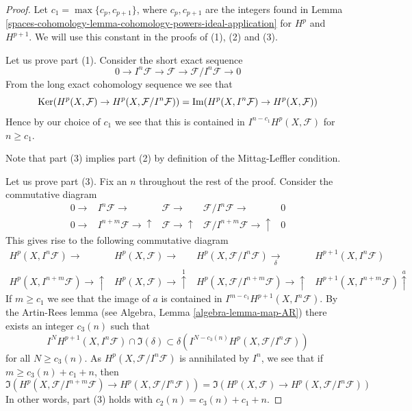 \begin{proof}
Let $c_1 = \max\{c_p, c_{p + 1}\}$, where $c_p, c_{p +1}$ are the integers
found in Lemma \ref{spaces-cohomology-lemma-cohomology-powers-ideal-application} for
$H^p$ and $H^{p + 1}$. We will use this constant in the proofs of
(1), (2) and (3).

\medskip\noindent
Let us prove part (1). Consider the short exact sequence
$$
0 \to I^n\mathcal{F} \to \mathcal{F} \to \mathcal{F}/I^n\mathcal{F} \to 0
$$
From the long exact cohomology sequence we see that
$$
\operatorname{Ker}(
H^p(X, \mathcal{F}) \to H^p(X, \mathcal{F}/I^n\mathcal{F})
)
=
\operatorname{Im}(
H^p(X, I^n\mathcal{F}) \to H^p(X, \mathcal{F})
)
$$
Hence by our choice of $c_1$ we see that this is contained in
$I^{n - c_1}H^p(X, \mathcal{F})$ for $n \geq c_1$.

\medskip\noindent
Note that part (3) implies part (2) by definition of the Mittag-Leffler
condition.

\medskip\noindent
Let us prove part (3).
Fix an $n$ throughout the rest of the proof.
Consider the commutative diagram
$$
\begin{array}{ccccc}0 \longrightarrow & I^n\mathcal{F} \longrightarrow & \mathcal{F} \longrightarrow & \mathcal{F}/I^n\mathcal{F} \longrightarrow & 0 \\ 0 \longrightarrow & I^{n + m}\mathcal{F} \longrightarrow\uparrow & \mathcal{F} \longrightarrow\uparrow & \mathcal{F}/I^{n + m}\mathcal{F} \longrightarrow\uparrow & 0\end{array}
$$
This gives rise to the following commutative diagram
$$
\begin{array}{cccc}H^p(X, I^n\mathcal{F}) \longrightarrow & H^p(X, \mathcal{F}) \longrightarrow & H^p(X, \mathcal{F}/I^n\mathcal{F}) \underset{\delta}{\longrightarrow} & H^{p + 1}(X, I^n\mathcal{F}) \\ H^p(X, I^{n + m}\mathcal{F}) \longrightarrow\uparrow & H^p(X, \mathcal{F}) \longrightarrow\overset{1}{\uparrow} & H^p(X, \mathcal{F}/I^{n + m}\mathcal{F}) \longrightarrow\uparrow & H^{p + 1}(X, I^{n + m}\mathcal{F}) \overset{a}{\uparrow}\end{array}
$$
If $m \geq c_1$ we see that the image of $a$ is
contained in $I^{m - c_1} H^{p + 1}(X, I^n\mathcal{F})$.
By the Artin-Rees lemma (see Algebra, Lemma \ref{algebra-lemma-map-AR})
there exists an integer $c_3(n)$ such that
$$
I^N H^{p + 1}(X, I^n\mathcal{F}) \cap \Im(\delta)
\subset
\delta\left(I^{N - c_3(n)}H^p(X, \mathcal{F}/I^n\mathcal{F})\right)
$$
for all $N \geq c_3(n)$. As $H^p(X, \mathcal{F}/I^n\mathcal{F})$
is annihilated by $I^n$, we see that if $m \geq c_3(n) + c_1 + n$,
then
$$
\Im(H^p(X, \mathcal{F}/I^{n + m}\mathcal{F})
\to H^p(X, \mathcal{F}/I^n\mathcal{F}))
=
\Im(H^p(X, \mathcal{F})
\to H^p(X, \mathcal{F}/I^n\mathcal{F}))
$$
In other words, part (3) holds with $c_2(n) = c_3(n) + c_1 + n$.
\end{proof}


